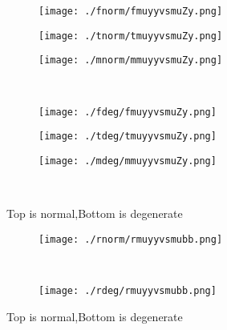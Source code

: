\documentclass[aps,floats,floatfix,nofootinbib]{revtex4-1}
\begin{document}
\begin{center}
\begin{figure}
\begin{subfigure}{0.3\textwidth}
\texttt{[image: ./fnorm/fmuyyvsmuZy.png]}
\label{}
\end{subfigure}
\begin{subfigure}{0.3\textwidth}
\texttt{[image: ./tnorm/tmuyyvsmuZy.png]}
\label{}
\end{subfigure}
\begin{subfigure}{0.3\textwidth}
\texttt{[image: ./mnorm/mmuyyvsmuZy.png]}
\label{}
\end{subfigure}\\
\begin{subfigure}{0.3\textwidth}
\texttt{[image: ./fdeg/fmuyyvsmuZy.png]}
\label{}
\end{subfigure}
\begin{subfigure}{0.3\textwidth}
\texttt{[image: ./tdeg/tmuyyvsmuZy.png]}
\label{}
\end{subfigure}
\begin{subfigure}{0.3\textwidth}
\texttt{[image: ./mdeg/mmuyyvsmuZy.png]}
\label{}
\end{subfigure}\\
\caption{Top is normal,Bottom is degenerate}
\end{figure}
\end{center}

\begin{center}
\begin{figure}
\begin{subfigure}{1.0\textwidth}
\texttt{[image: ./rnorm/rmuyyvsmubb.png]}
\label{}
\end{subfigure}\\
\begin{subfigure}{1.0\textwidth}
\texttt{[image: ./rdeg/rmuyyvsmubb.png]}
\label{}
\end{subfigure}
\caption{Top is normal,Bottom is degenerate}
\end{figure}
\end{center}
\end{document}

